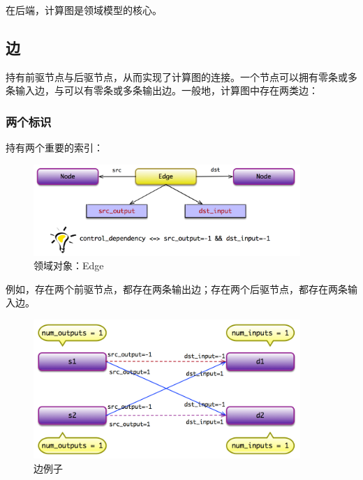 \begin{content}

在后端，计算图是领域模型的核心。

\subsection{边}

持有前驱节点与后驱节点，从而实现了计算图的连接。一个节点可以拥有零条或多条输入边，与可以有零条或多条输出边。一般地，计算图中存在两类边：

\begin{enum}
\end{enum}

\subsubsection{两个标识}

持有两个重要的索引：

\begin{enum}
\end{enum}


\begin{figure}[!htbp]
\centering
\includegraphics[width=0.9\textwidth]{figures/cc-edge-model.png}
\caption{领域对象：Edge}
 \label{fig:cc-edge-model}
\end{figure}

例如，存在两个前驱节点，都存在两条输出边；存在两个后驱节点，都存在两条输入边。

\begin{figure}[!htbp]
\centering
\includegraphics[width=0.9\textwidth]{figures/cc-edge-model-example.png}
\caption{边例子}
 \label{fig:cc-edge-model-example}
\end{figure}


\end{content}
